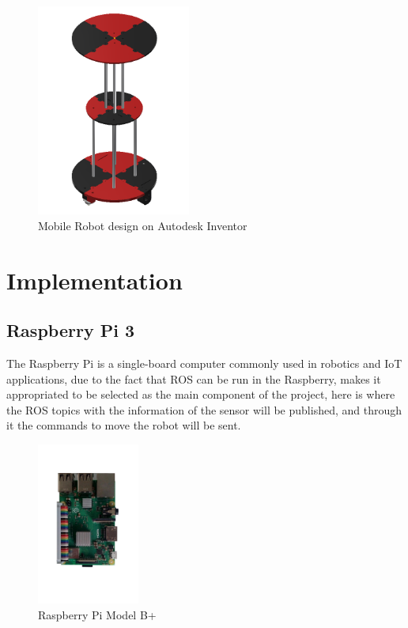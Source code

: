 \begin{figure}[h!]
    \centering
 	\includegraphics[trim=0 0 0 0,clip,width=0.45\textwidth]{Figs/Robot.png}
    \caption{Mobile Robot design on Autodesk Inventor}
    \label{fig:Robot}
\end{figure}

\newpage
\section{Implementation}

\subsection{Raspberry Pi 3}
The Raspberry Pi is a single-board computer commonly used in robotics and IoT applications, due to the fact that ROS can be run in the Raspberry, makes it appropriated to be selected as the main component of the project, here is where the ROS topics with the information of the sensor will be published, and through it the commands to move the robot will be sent.

\begin{figure}[h!]
    \centering
 	\includegraphics[trim=0 0 0 0,clip,width=0.3\textwidth]{Figs/Raspberry1.png}
    \caption{Raspberry Pi Model B+}
    \label{fig:RPI}
\end{figure}

